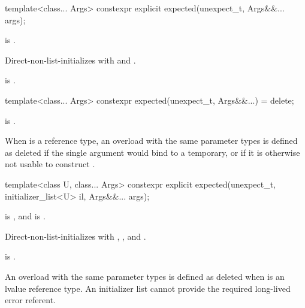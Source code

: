 %
\begin{itemdecl}
template<class... Args>
  constexpr explicit expected(unexpect_t, Args&&... args);
\end{itemdecl}

\begin{itemdescr}
\pnum
\constraints
{} is .

\pnum
\effects
Direct-non-list-initializes  with  and .

\pnum
\ensures
{} is .
\end{itemdescr}

%
\begin{itemdecl}
template<class... Args>
  constexpr expected(unexpect_t, Args&&...) = delete;
\end{itemdecl}

\begin{itemdescr}
\pnum
\constraints
{} is .

\pnum
\remarks
When  is a reference type, an overload with the same parameter types is defined as deleted if the single argument would bind  to a temporary, or if it is otherwise not usable to construct .
\end{itemdescr}

%
\begin{itemdecl}
template<class U, class... Args>
  constexpr explicit expected(unexpect_t, initializer_list<U> il, Args&&... args);
\end{itemdecl}

\begin{itemdescr}
\pnum
\constraints
{} is , and  is .

\pnum
\effects
Direct-non-list-initializes  with , , and .

\pnum
\ensures
{} is .

\pnum
\remarks
An overload with the same parameter types is defined as deleted when  is an lvalue reference type. An initializer list cannot provide the required long-lived error referent.
\end{itemdescr}

